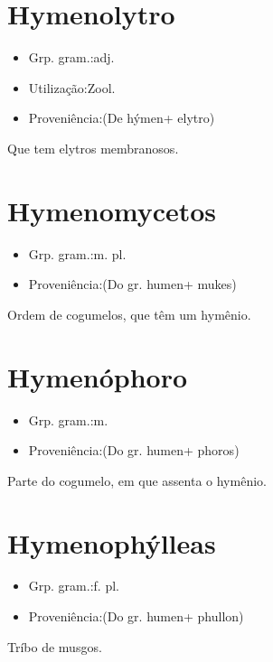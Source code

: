 \documentclass{article}
\begin{document}
\section{Hymenolytro}
\begin{itemize}
\item {Grp. gram.:adj.}
\end{itemize}
\begin{itemize}
\item {Utilização:Zool.}
\end{itemize}
\begin{itemize}
\item {Proveniência:(De \textunderscore hýmen\textunderscore  + \textunderscore elytro\textunderscore )}
\end{itemize}
Que tem elytros membranosos.
\section{Hymenomycetos}
\begin{itemize}
\item {Grp. gram.:m. pl.}
\end{itemize}
\begin{itemize}
\item {Proveniência:(Do gr. \textunderscore humen\textunderscore  + \textunderscore mukes\textunderscore )}
\end{itemize}
Ordem de cogumelos, que têm um hymênio.
\section{Hymenóphoro}
\begin{itemize}
\item {Grp. gram.:m.}
\end{itemize}
\begin{itemize}
\item {Proveniência:(Do gr. \textunderscore humen\textunderscore  + \textunderscore phoros\textunderscore )}
\end{itemize}
Parte do cogumelo, em que assenta o hymênio.
\section{Hymenophýlleas}
\begin{itemize}
\item {Grp. gram.:f. pl.}
\end{itemize}
\begin{itemize}
\item {Proveniência:(Do gr. \textunderscore humen\textunderscore  + \textunderscore phullon\textunderscore )}
\end{itemize}
Tríbo de musgos.
\end{document}
